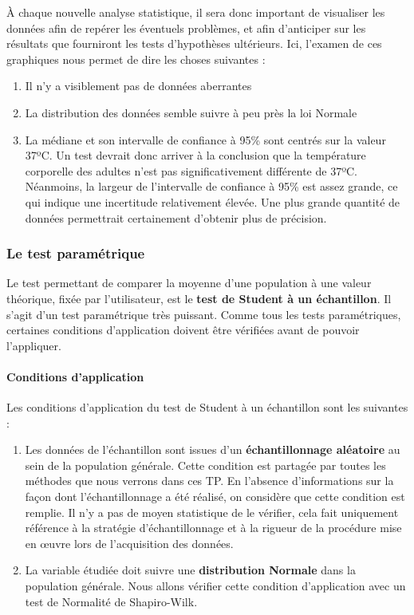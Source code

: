 \documentclass[a4paperpaper,]{article}
\providecommand{\tightlist}{%
  \setlength{\itemsep}{0pt}\setlength{\parskip}{0pt}}
\let\oldparagraph\paragraph
\renewcommand{\paragraph}[1]{\oldparagraph{#1}\mbox{}}
\begin{document}
À chaque nouvelle analyse statistique, il sera donc important de visualiser les données afin de repérer les éventuels problèmes, et afin d'anticiper sur les résultats que fourniront les tests d'hypothèses ultérieurs. Ici, l'examen de ces graphiques nous permet de dire les choses suivantes :

\begin{enumerate}
\def\labelenumi{\arabic{enumi}.}
\tightlist
\item
  Il n'y a visiblement pas de données aberrantes
\item
  La distribution des données semble suivre à peu près la loi Normale
\item
  La médiane et son intervalle de confiance à 95\% sont centrés sur la valeur 37ºC. Un test devrait donc arriver à la conclusion que la température corporelle des adultes n'est pas significativement différente de 37ºC. Néanmoins, la largeur de l'intervalle de confiance à 95\% est assez grande, ce qui indique une incertitude relativement élevée. Une plus grande quantité de données permettrait certainement d'obtenir plus de précision.
\end{enumerate}

\hypertarget{le-test-parametrique}{%
\subsubsection{Le test paramétrique}\label{le-test-parametrique}}

Le test permettant de comparer la moyenne d'une population à une valeur théorique, fixée par l'utilisateur, est le \textbf{test de Student à un échantillon}. Il s'agit d'un test paramétrique très puissant. Comme tous les tests paramétriques, certaines conditions d'application doivent être vérifiées avant de pouvoir l'appliquer.

\hypertarget{conditions-dapplication}{%
\paragraph{Conditions d'application}\label{conditions-dapplication}}

Les conditions d'application du test de Student à un échantillon sont les suivantes :

\begin{enumerate}
\def\labelenumi{\arabic{enumi}.}
\tightlist
\item
  Les données de l'échantillon sont issues d'un \textbf{échantillonnage aléatoire} au sein de la population générale. Cette condition est partagée par toutes les méthodes que nous verrons dans ces TP. En l'absence d'informations sur la façon dont l'échantillonnage a été réalisé, on considère que cette condition est remplie. Il n'y a pas de moyen statistique de le vérifier, cela fait uniquement référence à la stratégie d'échantillonnage et à la rigueur de la procédure mise en œuvre lors de l'acquisition des données.
\item
  La variable étudiée doit suivre une \textbf{distribution Normale} dans la population générale. Nous allons vérifier cette condition d'application avec un test de Normalité de Shapiro-Wilk.
\end{enumerate}
\end{document}
